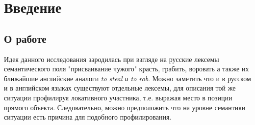 
\usepackage{alltt}
\usepackage{bibunits}
\usepackage{enumitem}
\usepackage{ltablex}
\usepackage{booktabs}



\tableofcontents
\pagebreak
\tab

\section{Введение} 
\subsection{О работе}
Идея данного исследования зародилась при взгляде на русские лексемы семантического поля "присваивание чужого" красть, грабить, воровать а также их ближайшие английские аналоги \textit{to steal и to rob}. Можно заметить что и в русском и в английском языках существуют отдельные лексемы, для описания той же ситуации профилируя локативного участника, т.е. выражая место в позиции прямого объекта. Следовательно, можно предположить что на уровне семантики ситуации есть причина для подобного профилирования.

